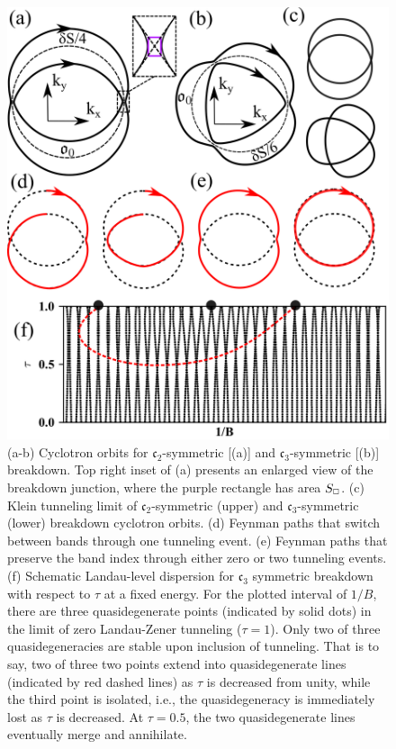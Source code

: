 \documentclass[aps, showpacs, twocolumn, notitlepage, superscriptaddress]{revtex4-1}
\begin{document}
\begin{figure}
\includegraphics[width=1.0\columnwidth]{Cn-breakdown.png}
\caption{(a-b) Cyclotron orbits for $\mathfrak{c}_2$-symmetric [(a)] and $\mathfrak{c}_3$-symmetric [(b)] breakdown. Top right inset of (a) presents an enlarged view of the breakdown junction, where the purple rectangle has area $S_{\scriptscriptstyle{\square}}$. (c) Klein tunneling limit of $\mathfrak{c}_2$-symmetric (upper) and $\mathfrak{c}_3$-symmetric (lower) breakdown cyclotron orbits. (d) Feynman paths that switch between bands through  one tunneling event. (e) Feynman paths that preserve the band index through either zero or two tunneling events. (f) Schematic Landau-level dispersion for $\mathfrak{c}_3$ symmetric breakdown with respect to $\tau$ at a fixed energy. For the plotted interval of $1/B$, there are three quasidegenerate points (indicated by solid dots) in the  limit of zero Landau-Zener tunneling ($\tau=1$). Only two of three quasidegeneracies are stable upon inclusion of tunneling. That is to say, two of three  two points extend into quasidegenerate lines (indicated by red dashed lines) as $\tau$ is decreased from unity, while the third point is isolated, i.e., the quasidegeneracy is immediately lost as $\tau$ is decreased. At $\tau=0.5$, the two quasidegenerate lines eventually merge and annihilate.\label{fig:Cn-breakdown}}
\end{figure}
\end{document}
